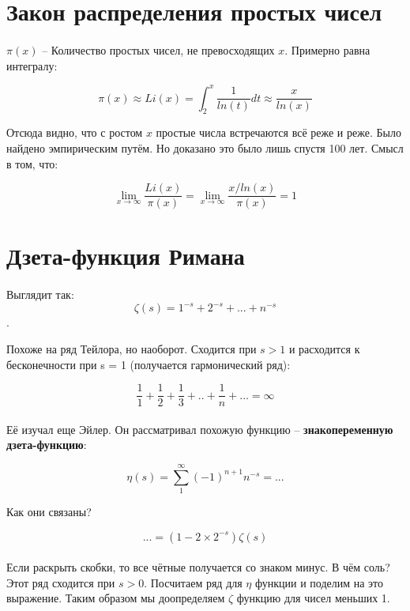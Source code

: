 \documentclass{article}
\begin{document}
 
\tableofcontents

\section{Закон распределения простых чисел}

\paragraph{}
$\pi(x)$ -- Количество простых чисел, не превосходящих $x$.
Примерно равна интегралу:

\[ \pi(x) \approx Li(x) = \int_{2}^{x} \frac{1}{ln(t)} dt \approx \frac{x}{ln(x)} \]

Отсюда видно, что с ростом $x$ простые числа встречаются всё реже и реже.
Было найдено эмпирическим путём. Но доказано это было лишь спустя 100 лет.
Смысл в том, что:

\[ \lim_{x \to \infty} \frac{Li(x)}{\pi(x)} = \lim_{x \to \infty} \frac{x/ln(x)}{\pi(x)} = 1 \]

\section{Дзета-функция Римана}

\paragraph{}
Выглядит так:
\[ \zeta(s) = 1^{-s} + 2^{-s} + ... + n^{-s} \].

Похоже на ряд Тейлора, но наоборот. Сходится при $s > 1$ и расходится к бесконечности при s = 1
(получается гармонический ряд):

\[ \frac{1}{1} + \frac{1}{2} + \frac{1}{3} + .. + \frac{1}{n} + ... = \infty \]

\paragraph{}
Её изучал еще Эйлер. Он рассматривал похожую функцию --
\textbf{знакопеременную дзета-функцию}:

\[ \eta (s) = \sum_{1}^{\infty} (-1)^{n+1} n^{-s} = ... \]

Как они связаны?

\[ ... = (1 - 2 \times 2^{-s}) \zeta(s) \]

\paragraph{}
Если раскрыть скобки, то все чётные получается со знаком минус.
В чём соль? Этот ряд сходится при $s > 0$. Посчитаем ряд для $\eta$ функции и
поделим на это выражение. Таким образом мы доопределяем $\zeta$ функцию для чисел меньших 1.
\end{document}
